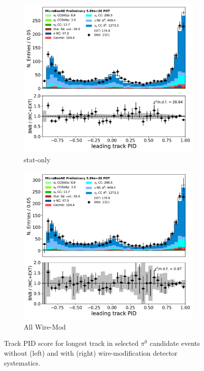 \documentclass[a4paper]{article}
\begin{document}
\begin{figure}[H] 
\begin{center}
    \begin{subfigure}[b]{0.4\textwidth}
    \centering
    \includegraphics[width=1.00\textwidth]{detsys/datamc/trkpid_03292020_statonly.pdf}
    \caption{\label{fig:detsys:datamc:trkpid:stat} stat-only}
    \end{subfigure}
    \begin{subfigure}[b]{0.4\textwidth}
    \centering
    \includegraphics[width=1.00\textwidth]{detsys/datamc/trkpid_03292020_detsys.pdf}
    \caption{\label{fig:detsys:datamc:trkpid:all}All Wire-Mod}
    \end{subfigure}
\caption{\label{fig:detsys:datamc:trkpid}Track PID score for longest track in selected $\pi^0$ candidate events without (left) and with (right) wire-modification detector systematics.}
\end{center}
\end{figure}
\end{document}
